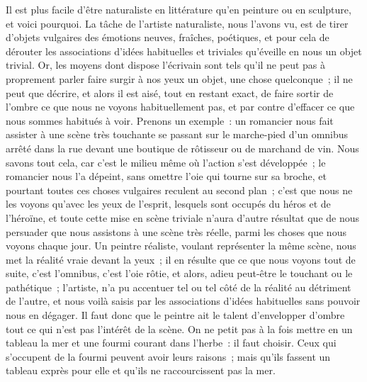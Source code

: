 \documentclass[french,twoside]{book} %
\begin{document}
Il est plus facile d’être naturaliste en littérature qu’en peinture ou en sculpture, et voici pourquoi. La tâche de l’artiste naturaliste, nous l’avons vu, est de tirer d’objets vulgaires des émotions neuves, fraîches, poétiques, et pour cela de dérouter les associations d’idées habituelles et triviales qu’éveille en nous un objet trivial. Or, les moyens dont dispose l’écrivain sont tels qu’il ne peut pas à proprement parler faire surgir à nos yeux un objet, une chose quelconque ; il ne peut que décrire, et alors il est aisé, tout en restant exact, de faire sortir de l’ombre ce que nous ne voyons habituellement pas, et par contre d’effacer ce que nous sommes habitués à voir. Prenons un exemple : un romancier nous fait assister à une scène très touchante se passant sur le marche-pied d’un omnibus arrêté dans la rue devant une boutique de rôtisseur ou de marchand de vin. Nous savons tout cela, car c’est le milieu même où l’action s’est développée ; le romancier nous l’a dépeint, sans omettre l’oie qui tourne sur sa broche, et pourtant toutes ces choses vulgaires reculent au second plan ; c’est que nous ne les voyons qu’avec les yeux de l’esprit, lesquels sont occupés du héros et de l’héroïne, et toute cette mise en scène triviale n’aura d’autre résultat que de nous persuader que nous assistons à une scène très réelle, parmi les choses que nous voyons chaque jour. Un peintre réaliste, voulant représenter la même scène, nous met la réalité vraie devant la yeux ; il en résulte que ce que nous voyons tout de suite, c’est l’omnibus, c’est l’oie rôtie, et alors, adieu peut-être le touchant ou le pathétique ; l’artiste, n’a pu accentuer tel ou tel côté de la réalité au détriment de l’autre, et nous voilà saisis par les associations d’idées habituelles sans pouvoir nous en dégager. Il faut donc que le peintre ait le talent d’envelopper d’ombre tout ce qui n’est pas l’intérêt de la scène. On ne petit pas à la fois mettre en un tableau la mer et une fourmi courant dans l’herbe : il faut choisir. Ceux qui s’occupent de la fourmi peuvent avoir leurs raisons ; mais qu’ils fassent un tableau exprès pour elle et qu’ils ne raccourcissent pas la mer.
\end{document}
